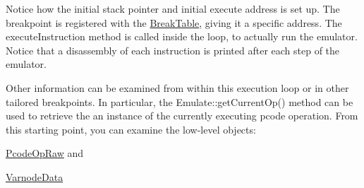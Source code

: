 Notice how the initial stack pointer and initial execute address is set up. The breakpoint is registered with the \mbox{\hyperlink{class_break_table}{Break\+Table}}, giving it a specific address. The execute\+Instruction method is called inside the loop, to actually run the emulator. Notice that a disassembly of each instruction is printed after each step of the emulator.

Other information can be examined from within this execution loop or in other tailored breakpoints. In particular, the Emulate\+::get\+Current\+Op() method can be used to retrieve the an instance of the currently executing pcode operation. From this starting point, you can examine the low-\/level objects\+:
\begin{DoxyItemize}
\item \mbox{\hyperlink{class_pcode_op_raw}{Pcode\+Op\+Raw}} and
\item \mbox{\hyperlink{struct_varnode_data}{Varnode\+Data}} 
\end{DoxyItemize}